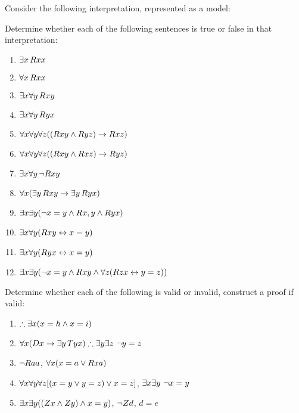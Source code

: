 \leibniz
\practiceproblems
\problempart
\label{pr.TorF3}
Consider the following interpretation, represented as a model:	
\begin{center}
\end{center}
Determine whether each of the following sentences is true or false in that interpretation:
\begin{enumerate}
\item $\exists x\, \mathord{R}xx$
\item $\forall x\, \mathord{R}xx$
\item $\exists x \forall y\, \mathord{R}xy$
\item $\exists x \forall y\, \mathord{R}yx$
\item $\forall x \forall y \forall z ((\mathord{R}xy \wedge \mathord{R}yz) \rightarrow \mathord{R}xz)$
\item $\forall x \forall y \forall z ((\mathord{R}xy \wedge \mathord{R}xz) \rightarrow \mathord{R}yz)$
\item $\exists x \forall y\, \neg \mathord{R}xy$
\item $\forall x(\exists y\, \mathord{R}xy \rightarrow \exists y\, \mathord{R}yx)$
\item $\exists x \exists y (\neg x = y \wedge \mathord{R}x,y \wedge \mathord{R}yx)$
\item $\exists x \forall y(\mathord{R}xy \leftrightarrow x = y)$
\item $\exists x \forall y(\mathord{R}yx \leftrightarrow x = y)$
\item $\exists x \exists y(\neg x = y \wedge \mathord{R}xy \wedge \forall z(\mathord{R}zx \leftrightarrow y = z))$
\end{enumerate}
\problempart
Determine whether each of the following is valid or invalid, construct a proof if valid:
\begin{enumerate}
\item $\therefore \exists x (x = h \eand x = i)$
\item $\forall x(\atom{D}{x} \eif \exists y\, \atom{T}{yx}) \therefore \exists y \exists z\ \enot y= z$
\item $\neg \mathord{R}aa$, $\forall x (x=a \vee \mathord{R}xa)$
\item $\forall x\forall y\forall z[(x=y \vee y=z )\vee x=z]$, $\exists x\exists y\ \enot x= y$
\item $\exists x\exists y((\mathord{Z}x \wedge \mathord{Z}y )\wedge x=y)$, $\neg \mathord{Z}d$, $d=e$
\end{enumerate}


